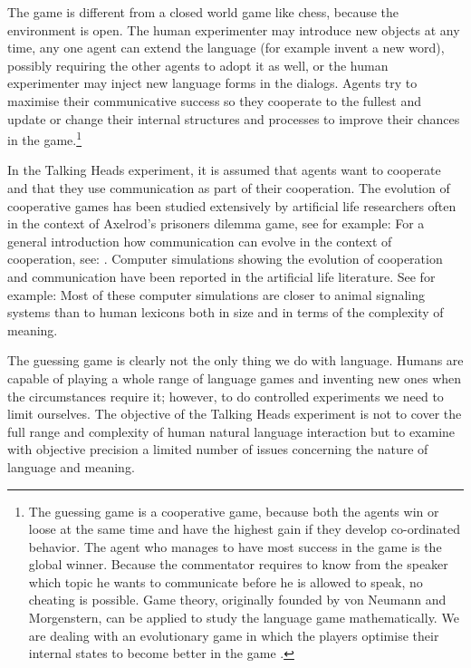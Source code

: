 The game is different from a closed world game like 
chess, because the environment is open. The human 
experimenter may introduce new objects at any
time, any one agent can extend
the language (for example invent a new word), possibly
requiring the other agents to adopt it as well, or the
human experimenter may inject new language forms in the 
dialogs. Agents try to maximise their communicative 
success so they cooperate to the fullest and update or change
their internal structures and processes
to improve their chances in the game.\footnote{
The guessing game is a cooperative game, because
both the agents win or loose at the same time and have 
the highest gain if they develop co-ordinated behavior. 
The agent who manages to have most success in the game is 
the global winner. Because the commentator requires to know 
from the speaker which topic he wants to communicate 
before he is allowed to speak, no cheating 
is possible. Game theory, originally founded by 
von Neumann and Morgenstern, can be applied to study the 
language game mathematically.  We are dealing with an 
evolutionary game in which the players optimise their 
internal states to become better in the game 
\cite{Maynard:1982}.}

In the Talking Heads experiment, it is assumed that 
agents want to cooperate and that they use communication
as part of their cooperation. 
The evolution of cooperative games has been studied 
extensively by artificial life researchers often 
in the context of Axelrod's prisoners dilemma game, 
see for example: \cite{Ikegami:1994} 
For a general introduction how communication can 
evolve in the context of cooperation, see: \cite{Hauser:1996}. 
Computer simulations showing the evolution of 
cooperation and communication have been reported in the
artificial life literature. See for example: \cite{MacLennan:1991} 
Most of these computer simulations are 
closer to animal signaling systems than to human lexicons
both in size and in terms of the complexity of meaning.

The guessing game is clearly not the only thing we do 
with language. Humans are capable of playing a whole 
range of language games and inventing
new ones when the circumstances
require it; however, to do controlled experiments we need
to limit ourselves. The objective of the Talking Heads
experiment is not to cover the full range and complexity
of human natural language interaction but to examine with
objective precision a limited number of issues concerning
the nature of language and meaning. 

